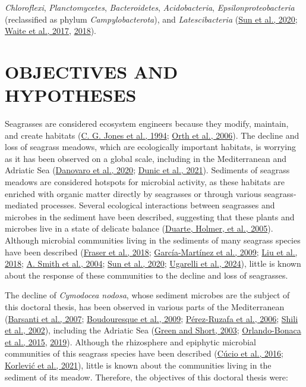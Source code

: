 \documentclass[
  12 pt,
]{book}
\begin{document}
\emph{Chloroflexi}, \emph{Planctomycetes}, \emph{Bacteroidetes}, \emph{Acidobacteria}, \emph{Epsilonproteobacteria} (reclassified as phylum \emph{Campylobacterota}), and \emph{Latescibacteria} (\protect\hyperlink{ref-Sun2020}{Sun et al., 2020}; \protect\hyperlink{ref-Waite2017}{Waite et al., 2017}, \protect\hyperlink{ref-Waite2018}{2018}).

\hypertarget{chapter-objectives-and-hypotheses}{%
\chapter{OBJECTIVES AND HYPOTHESES}\label{chapter-objectives-and-hypotheses}}

Seagrasses are considered ecosystem engineers because they modify, maintain, and create habitats (\protect\hyperlink{ref-Jones1994}{C. G. Jones et al., 1994}; \protect\hyperlink{ref-Orth2006}{Orth et al., 2006}). The decline and loss of seagrass meadows, which are ecologically important habitats, is worrying as it has been observed on a global scale, including in the Mediterranean and Adriatic Sea (\protect\hyperlink{ref-Danovaro2020}{Danovaro et al., 2020}; \protect\hyperlink{ref-Dunic2021}{Dunic et al., 2021}). Sediments of seagrass meadows are considered hotspots for microbial activity, as these habitats are enriched with organic matter directly by seagrasses or through various seagrass-mediated processes. Several ecological interactions between seagrasses and microbes in the sediment have been described, suggesting that these plants and microbes live in a state of delicate balance (\protect\hyperlink{ref-Duarte2005}{Duarte, Holmer, et al., 2005}). Although microbial communities living in the sediments of many seagrass species have been described (\protect\hyperlink{ref-Fraser2018}{Fraser et al., 2018}; \protect\hyperlink{ref-Garcia-Martinez2009}{García-Martínez et al., 2009}; \protect\hyperlink{ref-Liu2018}{Liu et al., 2018}; \protect\hyperlink{ref-Smith2004}{A. Smith et al., 2004}; \protect\hyperlink{ref-Sun2020}{Sun et al., 2020}; \protect\hyperlink{ref-Ugarelli2024}{Ugarelli et al., 2024}), little is known about the response of these communities to the decline and loss of seagrasses.

The decline of \emph{Cymodocea nodosa}, whose sediment microbes are the subject of this doctoral thesis, has been observed in various parts of the Mediterranean (\protect\hyperlink{ref-Barsanti2007}{Barsanti et al., 2007}; \protect\hyperlink{ref-Boudouresque2009}{Boudouresque et al., 2009}; \protect\hyperlink{ref-Perez-Ruzafa2006}{Pérez-Ruzafa et al., 2006}; \protect\hyperlink{ref-Shili2002}{Shili et al., 2002}), including the Adriatic Sea (\protect\hyperlink{ref-Green2003}{Green and Short, 2003}; \protect\hyperlink{ref-Orlando-Bonaca2015}{Orlando-Bonaca et al., 2015}, \protect\hyperlink{ref-Orlando-Bonaca2019}{2019}). Although the rhizosphere and epiphytic microbial communities of this seagrass species have been described (\protect\hyperlink{ref-Cucio2016}{Cúcio et al., 2016}; \protect\hyperlink{ref-Korlevic2021}{Korlević et al., 2021}), little is known about the communities living in the sediment of its meadow. Therefore, the objectives of this doctoral thesis were:
\end{document}
